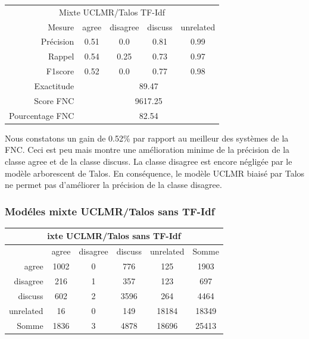 \documentclass[11pt,a4paper,oldfontcommands]{memoir}
\begin{document}
\begin{center}
 \begin{tabular}{ r | c c c c }
  \multicolumn{5}{c}{Mixte UCLMR/Talos TF-Idf}                                   \\
  Mesure          & agree                       & disagree & discuss & unrelated \\
  \hline
  Précision       & 0.51                        & 0.0      & 0.81    & 0.99      \\
  Rappel          & 0.54                        & 0.25     & 0.73    & 0.97      \\
  F1score         & 0.52                        & 0.0      & 0.77    & 0.98      \\
  \hline
  \hline
  Exactitude      & \multicolumn{4}{c}{89.47}                                    \\
  Score FNC       & \multicolumn{4}{c}{9617.25}                                  \\
  Pourcentage FNC & \multicolumn{4}{c}{82.54}                                    \\
 \end{tabular}
\end{center}
Nous constatons un gain de 0.52\% par rapport au meilleur des systèmes de la FNC.
Ceci est peu mais montre une amélioration minime de la précision de la classe agree et de la classe discuss.
La classe disagree est encore négligée par le modèle arborescent de Talos.
En conséquence, le modèle UCLMR biaisé par Talos ne permet pas d'améliorer la précision de la classe disagree.


\subsubsection{Modéles mixte UCLMR/Talos sans TF-Idf}
\begin{center}
 \begin{tabular}{ r | c c c c | c }
  \multicolumn{6}{c}{ixte UCLMR/Talos sans TF-Idf}           \\
  \hline
            & agree & disagree & discuss & unrelated & Somme \\
  \hline
  agree     & 1002  & 0        & 776     & 125       & 1903  \\
  disagree  & 216   & 1        & 357     & 123       & 697   \\
  discuss   & 602   & 2        & 3596    & 264       & 4464  \\
  unrelated & 16    & 0        & 149     & 18184     & 18349 \\
  \hline
  Somme     & 1836  & 3        & 4878    & 18696     & 25413 \\
 \end{tabular}
\end{center}
\end{document}
